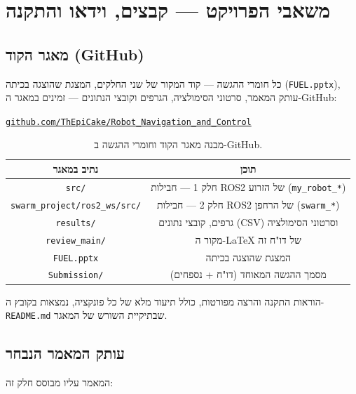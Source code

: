 \documentclass[11pt,a4paper]{article}
\newcommand{\repourl}{https://github.com/ThEpiCake/Robot_Navigation_and_Control}
\newcommand{\repotext}{\textenglish{\texttt{github.com/ThEpiCake/Robot\_Navigation\_and\_Control}}}
\begin{document}
\section{משאבי הפרויקט — קבצים, וידאו והתקנה}

\subsection{מאגר הקוד (\textenglish{GitHub})}
\label{sec:links}

כל חומרי ההגשה — קוד המקור של שני החלקים, המצגת שהוצגה בכיתה (\texttt{\textenglish{FUEL.pptx}}), עותק המאמר, סרטוני הסימולציה, הגרפים וקובצי הנתונים — זמינים במאגר ה-\textenglish{GitHub}:

\begin{center}
\href{\repourl}{\repotext}
\end{center}

\begin{table}[H]
\centering
\begin{tabular}{cc}
\toprule
\textbf{נתיב במאגר} & \textbf{תוכן} \\
\midrule
\texttt{\textenglish{src/}} & חלק 1 — חבילות \textenglish{ROS2} של הזרוע (\textenglish{\texttt{my\_robot\_*}}) \\
\texttt{\textenglish{swarm\_project/ros2\_ws/src/}} & חלק 2 — חבילות \textenglish{ROS2} של הרחפן (\textenglish{\texttt{swarm\_*}}) \\
\texttt{\textenglish{results/}} & גרפים, קובצי נתונים (\textenglish{CSV}) וסרטוני הסימולציה \\
\texttt{\textenglish{review\_main/}} & מקור ה-\textenglish{LaTeX} של דו"ח זה \\
\texttt{\textenglish{FUEL.pptx}} & המצגת שהוצגה בכיתה \\
\texttt{\textenglish{Submission/}} & מסמך ההגשה המאוחד (דו"ח + נספחים) \\
\bottomrule
\end{tabular}
\caption{מבנה מאגר הקוד וחומרי ההגשה ב-\textenglish{GitHub}.}
\label{tab:repo_layout}
\end{table}

הוראות התקנה והרצה מפורטות, כולל תיעוד מלא של כל פונקציה, נמצאות בקובץ ה-\texttt{\textenglish{README.md}} שבתיקיית השורש של המאגר.

\subsection{עותק המאמר הנבחר}

המאמר עליו מבוסס חלק זה:
\end{document}

